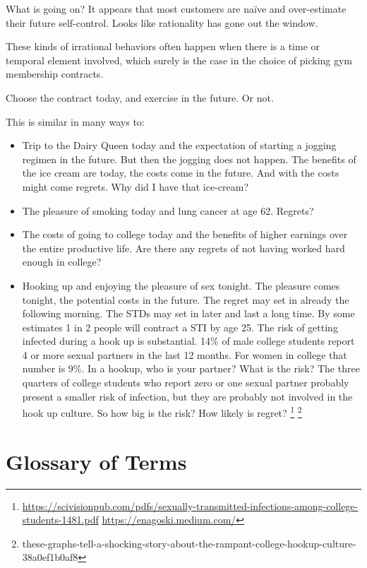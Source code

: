 \documentclass[
]{book}
\begin{document}
What is going on? It appears that most customers are naïve and over-estimate their future self-control. Looks like rationality has gone out the window.

These kinds of irrational behaviors often happen when there is a time or temporal element involved, which surely is the case in the choice of picking gym membership contracts.

Choose the contract today, and exercise in the future. Or not.

This is similar in many ways to:

\begin{itemize}
\item
  Trip to the Dairy Queen today and the expectation of starting a jogging regimen in the future. But then the jogging does not happen. The benefits of the ice cream are today, the costs come in the future. And with the costs might come regrets. Why did I have that ice-cream?
\item
  The pleasure of smoking today and lung cancer at age 62. Regrets?
\item
  The costs of going to college today and the benefits of higher earnings over the entire productive life. Are there any regrets of not having worked hard enough in college?
\item
  Hooking up and enjoying the pleasure of sex tonight. The pleasure comes tonight, the potential costs in the future. The regret may set in already the following morning. The STDs may set in later and last a long time. By some estimates 1 in 2 people will contract a STI by age 25. The risk of getting infected during a hook up is substantial. 14\% of male college students report 4 or more sexual partners in the last 12 months. For women in college that number is 9\%. In a hookup, who is your partner? What is the risk? The three quarters of college students who report zero or one sexual partner probably present a smaller risk of infection, but they are probably not involved in the hook up culture. So how big is the risk? How likely is regret? \footnote{
    \url{https://scivisionpub.com/pdfs/sexually-transmitted-infections-among-college-students-1481.pdf}
    \url{https://enagoski.medium.com/}} \footnote{these-graphs-tell-a-shocking-story-about-the-rampant-college-hookup-culture-38a0ef1b0af8}
\end{itemize}

\hypertarget{glossary-of-terms-3}{%
\section{Glossary of Terms}\label{glossary-of-terms-3}}
\end{document}
